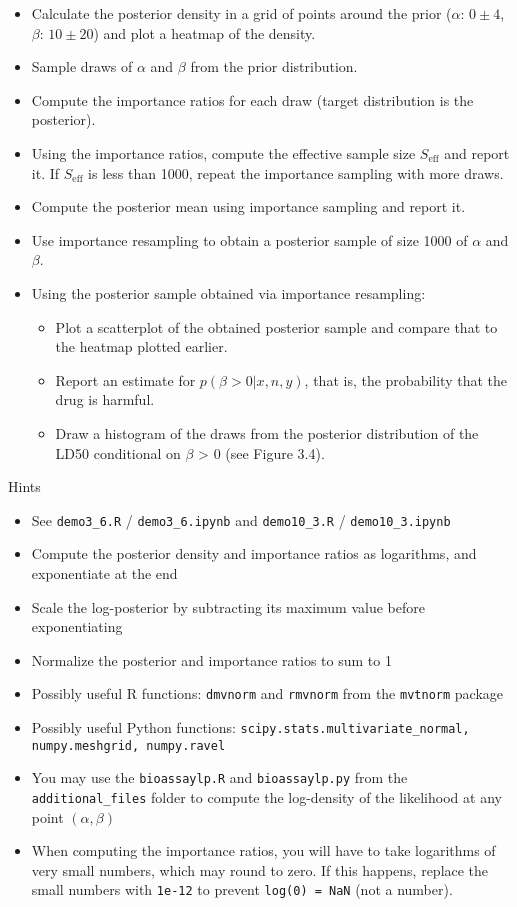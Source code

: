 \documentclass[a4paper,11pt]{article}
\begin{document}
  \begin{itemize}
  \item Calculate the posterior density in a grid of points around the prior ($\alpha$: $0 \pm 4$, $\beta$: $10 \pm 20$) and plot a heatmap of the density.
\item Sample draws of $\alpha$ and $\beta$ from the prior distribution.
\item Compute the importance ratios for each draw (target distribution is the posterior).
\item Using the importance ratios, compute the effective sample size $S_{\text{eff}}$ and report it. If $S_{\text{eff}}$ is less than 1000, repeat the importance sampling with more draws.
\item Compute the posterior mean using importance sampling and report it.
\item Use importance resampling to obtain a posterior sample of size 1000 of $\alpha$ and $\beta$.
\item Using the posterior sample obtained via importance resampling:
\begin{itemize}
\item Plot a scatterplot of the obtained posterior sample and compare that to the heatmap plotted earlier.
\item Report an estimate for $p(\beta > 0|x, n, y)$, that is, the probability that the drug is harmful.
\item Draw a histogram of the draws from the posterior distribution of the LD50 conditional on $\beta$ > 0 (see Figure 3.4).
\end{itemize}
  \end{itemize}
Hints
\begin{itemize}
\item See {\tt demo3\_6.R} / {\tt demo3\_6.ipynb} and {\tt demo10\_3.R} / {\tt demo10\_3.ipynb}
\item Compute the posterior density and importance ratios as logarithms, and exponentiate at the end
\item Scale the log-posterior by subtracting its maximum value before
  exponentiating
  \item Normalize the posterior and importance ratios to sum to 1
  \item Possibly useful R functions: {\tt dmvnorm} and {\tt rmvnorm} from the {\tt mvtnorm} package
  \item Possibly useful Python functions: {\tt scipy.stats.multivariate\_normal, numpy.meshgrid, numpy.ravel}
  \item You may use the {\tt bioassaylp.R} and {\tt bioassaylp.py} from the {\tt additional\_files} folder to compute the log-density of the likelihood at any point $(\alpha, \beta)$
    \item When computing the importance ratios, you will have to take logarithms of very small numbers, which may round to zero. If this happens, replace the small numbers with {\tt 1e-12} to prevent {\tt log(0) = NaN} (not a number).
\end{itemize}
\end{document}
